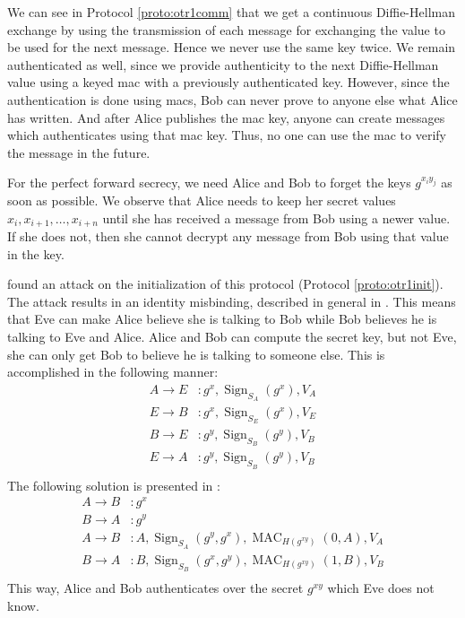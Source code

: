 \documentclass[draft]{llncs}
\DeclareMathOperator{\sign}{\mathrm{Sign}}
\DeclareMathOperator{\mac}{\mathrm{MAC}}
\begin{document}
We can see in Protocol \ref{proto:otr1comm} that we get a continuous 
Diffie-Hellman exchange by using the transmission of each message for 
exchanging the value to be used for the next message.
Hence we never use the same key twice.
We remain authenticated as well, since we provide authenticity to the next 
Diffie-Hellman value using a keyed \ac{mac} with a previously authenticated 
key.
However, since the authentication is done using \acp{mac}, Bob can never prove 
to anyone else what Alice has written.
And after Alice publishes the \ac{mac} key, anyone can create messages which 
authenticates using that \ac{mac} key.
Thus, no one can use the \ac{mac} to verify the message in the future.

For the perfect forward secrecy, we need Alice and Bob to forget the keys 
\(g^{x_i y_j}\) as soon as possible.
We observe that Alice needs to keep her secret values \(x_i, x_{i+1}, \ldots, 
x_{i+n}\) until she has received a message from Bob using a newer value.
If she does not, then she cannot decrypt any message from Bob using that value 
in the key.

\citeauthor{di2005secure} \cite{di2005secure} found an attack on the 
initialization of this protocol (Protocol \ref{proto:otr1init}).
The attack results in an identity misbinding, described in general in 
\cite{ake}.
This means that Eve can make Alice believe she is talking to Bob while Bob 
believes he is talking to Eve and Alice.
Alice and Bob can compute the secret key, but not Eve, she can only get Bob to 
believe he is talking to someone else.
This is accomplished in the following manner:
\begin{align*}
  A\to E &\colon g^x, \sign_{S_A}( g^x ), V_A \\
  E\to B &\colon g^x, \sign_{S_E}( g^x ), V_E \\
  B\to E &\colon g^y, \sign_{S_B}( g^y ), V_B \\
  E\to A &\colon g^y, \sign_{S_B}( g^y ), V_B \\
\end{align*}
The following solution is presented in \cite{di2005secure}:
\begin{align*}
  A\to B &\colon g^{x} \\
  B\to A &\colon g^{y} \\
  A\to B &\colon A,
    \sign_{S_A}( g^{y}, g^{x} ),
    \mac_{H( g^{x y} )}( 0, A ),
    V_A \\
  B\to A &\colon B,
    \sign_{S_B}( g^{x}, g^{y} ),
    \mac_{H( g^{x y} )}( 1, B ),
    V_B \\
\end{align*}
This way, Alice and Bob authenticates over the secret \(g^{xy}\) which Eve does 
not know.
\end{document}
